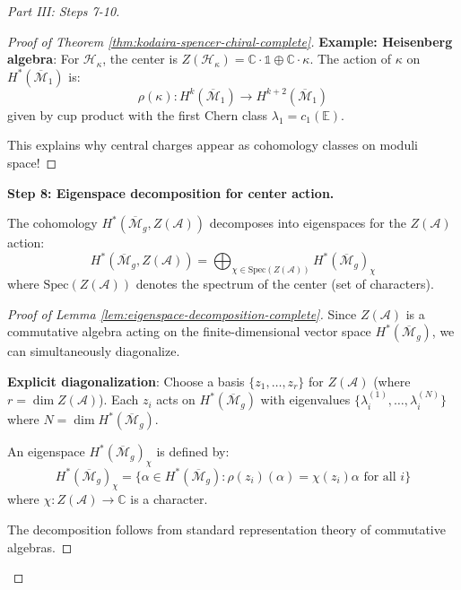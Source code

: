 \begin{proof}[Part III: Steps 7-10]
\begin{proof}[Proof of Theorem \ref{thm:kodaira-spencer-chiral-complete}]
\textbf{Example: Heisenberg algebra}: For $\mathcal{H}_\kappa$, the center is $Z(
\mathcal{H}_\kappa) = \mathbb{C} \cdot \mathbb{1} \oplus \mathbb{C} \cdot \kappa$. 
The action of $\kappa$ on $H^*(\overline{\mathcal{M}}_1)$ is:
\begin{equation}
\rho(\kappa): H^k(\overline{\mathcal{M}}_1) \to H^{k+2}(\overline{\mathcal{M}}_1)
\end{equation}
given by cup product with the first Chern class $\lambda_1 = c_1(\mathbb{E})$.

This explains why central charges appear as cohomology classes on moduli space!
\end{proof}

\textbf{Step 8: Eigenspace decomposition for center action.}

\begin{lemma}
\label{lem:eigenspace-decomposition-complete}
The cohomology $H^*(\overline{\mathcal{M}}_g, Z(\mathcal{A}))$ decomposes into 
eigenspaces for the $Z(\mathcal{A})$ action:
\begin{equation}
H^*(\overline{\mathcal{M}}_g, Z(\mathcal{A})) = \bigoplus_{\chi \in \text{Spec}(Z(
\mathcal{A}))} H^*(\overline{\mathcal{M}}_g)_\chi
\end{equation}
where $\text{Spec}(Z(\mathcal{A}))$ denotes the spectrum of the center (set of 
characters).
\end{lemma}

\begin{proof}[Proof of Lemma \ref{lem:eigenspace-decomposition-complete}]
Since $Z(\mathcal{A})$ is a commutative algebra acting on the finite-dimensional 
vector space $H^*(\overline{\mathcal{M}}_g)$, we can simultaneously diagonalize.

\textbf{Explicit diagonalization}: Choose a basis $\{z_1, \ldots, z_r\}$ for $Z(
\mathcal{A})$ (where $r = \dim Z(\mathcal{A})$). Each $z_i$ acts on $H^*(\overline{
\mathcal{M}}_g)$ with eigenvalues $\{\lambda_i^{(1)}, \ldots, \lambda_i^{(N)}\}$ where 
$N = \dim H^*(\overline{\mathcal{M}}_g)$.

An eigenspace $H^*(\overline{\mathcal{M}}_g)_\chi$ is defined by:
\begin{equation}
H^*(\overline{\mathcal{M}}_g)_\chi = \{\alpha \in H^*(\overline{\mathcal{M}}_g) : 
\rho(z_i)(\alpha) = \chi(z_i) \alpha \text{ for all } i\}
\end{equation}
where $\chi: Z(\mathcal{A}) \to \mathbb{C}$ is a character.

The decomposition follows from standard representation theory of commutative algebras.
\end{proof}


\end{proof}
